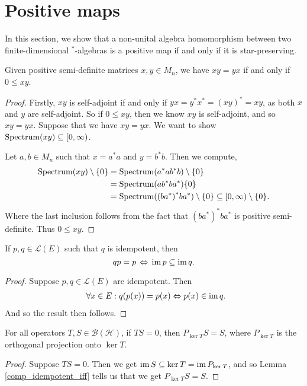 \chapter{Positive maps}

 In this section, we show that a non-unital algebra homomorphism between two finite-dimensional $^*$-algebras is a positive map if and only if it is star-preserving.

 \begin{lemma}\label{posSemidef_iff_commute}
  \leanok
  Given positive semi-definite matrices $x,y\in M_n$, we have $xy=yx$ if and only if $0\leq{xy}$.
 \end{lemma}
 \begin{proof}\leanok
  Firstly, $xy$ is self-adjoint if and only if $yx=y^*x^*=(xy)^*=xy$, as both $x$ and $y$ are self-adjoint.
  So if $0\leq xy$, then we know $xy$ is self-adjoint, and so $xy=yx$.
  Suppose that we have $xy=yx$. We want to show $\operatorname{Spectrum}(xy)\subseteq[0,\infty)$.
 
  Let $a,b\in M_n$ such that $x=a^*a$ and $y=b^*b$. Then we compute,
  \begin{align*}
   \operatorname{Spectrum}(xy)\setminus\{0\} &= \operatorname{Spectrum}(a^*ab^*b)\setminus\{0\}\\
   &= \operatorname{Spectrum}(ab^*ba^*)\{0\}\\
   &= \operatorname{Spectrum}({(ba^*)}^*ba^*)\setminus\{0\}\subseteq[0,\infty)\setminus\{0\}.
  \end{align*}
  Where the last inclusion follows from the fact that ${(ba^*)}^*ba^*$ is positive semi-definite.
  Thus $0\leq xy$.
 \end{proof}

 \begin{lemma}\label{comp_idempotent_iff}
  \leanok
  If $p,q\in \mathcal{L}(E)$ such that $q$ is idempotent, then
  \[qp=p \,\Leftrightarrow\, \operatorname{im}{p}\subseteq\operatorname{im}{q}.\]
 \end{lemma}
 \begin{proof}\leanok
  Suppose $p,q\in\mathcal{L}(E)$ are idempotent. Then
  \begin{align*}
   &\quad\;\;\forall{x}\in{E}:q(p(x))=p(x) \Leftrightarrow p(x)\in\operatorname{im}{q}.
  \end{align*}
  And so the result then follows.
 \end{proof}

 \begin{corollary}\label{orthogonalProjection_ker_comp_eq_of_comp_eq_zero}
  \leanok
  For all operators $T,S\in\mathcal{B}(\mathcal{H})$, if $TS=0$, then $P_{\ker{T}}S=S$, where $P_{\ker{T}}$ is the orthogonal projection onto $\ker{T}$.
 \end{corollary}
 \begin{proof}\leanok
  Suppose $TS=0$. Then we get $\operatorname{im}{S}\subseteq\ker{T}=\operatorname{im}{P_{\ker{T}}}$, and so Lemma \ref{comp_idempotent_iff} tells us that we get $P_{\ker{T}}S=S$.
 \end{proof}

